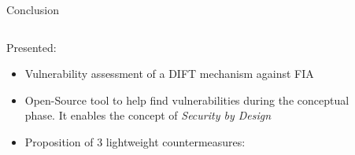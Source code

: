 \begin{frame}{Conclusion}
    \begin{columns}
        \begin{column}{.7\linewidth}
            \begin{block}{Presented:}
                \begin{itemize}
                    [triangle]
                    \item<1> Vulnerability assessment of a DIFT mechanism against FIA
                    \item<2> Open-Source tool to help find vulnerabilities during the conceptual phase. It enables the concept of \textit{Security by Design}
                    \item<3> Proposition of 3 lightweight countermeasures:
                \end{itemize}
            \end{block}
        \end{column}
        \begin{column}{.3\linewidth}
            \begin{figure}
                \centering

\end{figure}
\end{column}
\end{columns}
\end{frame}

